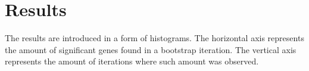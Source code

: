 \documentclass[11pt,a4paper,oneside]{article}
\begin{document}
\section{Results}

The results are introduced in a form of histograms. The horizontal axis represents the amount of significant genes found in a bootstrap iteration. The vertical axis represents the amount of iterations where such amount was observed.



\end{document}
